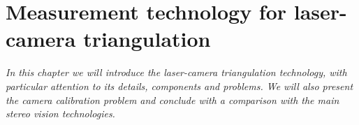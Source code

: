 \chapter{Measurement technology for laser-camera triangulation}
\label{ch:technology}
%
%

\textit{In this chapter we will introduce the laser-camera triangulation technology, with particular attention to its details, components and problems. We will also present the camera calibration problem and conclude with a comparison with the main stereo vision technologies.}

  

  

  

  

  
